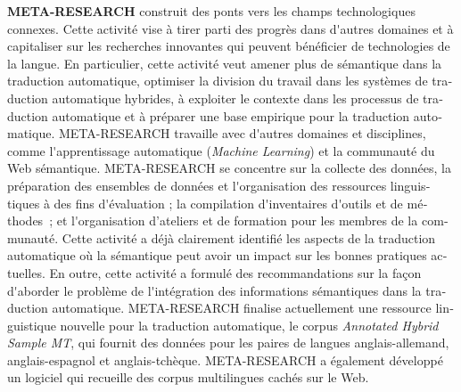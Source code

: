 \documentclass[]{../metanetpaper}
\begin{document}
\begin{french}
\begin{multicols}{2}
\textbf{META-RESEARCH} construit des ponts vers les champs technologiques connexes. Cette activité vise à tirer parti des progrès dans d{\mbox '}autres domaines et à capitaliser sur les recherches innovantes qui peuvent bénéficier de technologies de la langue. En particulier, cette activité veut amener plus de sémantique dans la traduction automatique, optimiser la division du travail dans les systèmes de traduction automatique hybrides, à exploiter le contexte dans les processus de traduction automatique et à préparer une base empirique pour la traduction automatique. META-RESEARCH travaille avec d{\mbox '}autres domaines et disciplines, comme l{\mbox '}apprentissage automatique ({\it Machine Learning}) et la communauté du Web sémantique. META-RESEARCH se concentre sur la collecte des données, la préparation des ensembles de données et l{\mbox '}organisation des ressources linguistiques à des fins d{\mbox '}évaluation ; la compilation d{\mbox '}inventaires d{\mbox '}outils et de méthodes~; et l{\mbox '}organisation d'ateliers et de formation pour les membres de la communauté. Cette activité a déjà clairement identifié les aspects de la traduction automatique où la sémantique peut avoir un impact sur les bonnes pratiques actuelles. En outre, cette activité a formulé des recommandations sur la façon d{\mbox '}aborder le problème de l{\mbox '}intégration des informations sémantiques dans la traduction automatique. META-RESEARCH finalise actuellement une ressource linguistique nouvelle pour la traduction automatique, le corpus {\it Annotated Hybrid Sample MT}, qui fournit des données pour les paires de langues anglais-allemand, anglais-espagnol et anglais-tchèque. META-RESEARCH a également développé un logiciel qui recueille des corpus multilingues cachés sur le Web.
\end{multicols}

\end{french}


\cleardoublepage



\end{document}
